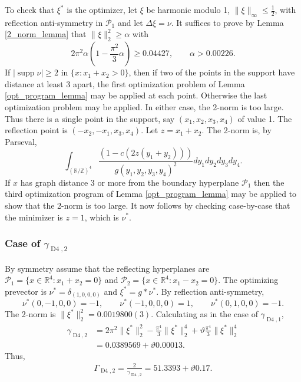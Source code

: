 \documentclass[a4paper, 12pt, notitlepage]{amsart}
\newcommand{\Dfour}{\operatorname{D4}}
\newcommand{\supp}{\operatorname{supp}}
\newcommand{\bR}{\mathbb{R}}
\newcommand{\zed}{\mathbb{Z}}
\newcommand{\sP}{{\mathscr{P}}}
\theoremstyle{remark}
\begin{document}
To check that $\xi^*$ is the optimizer, let $\xi$ be harmonic modulo 1, $\|\xi\|_\infty \leq \frac{1}{2}$, with reflection anti-symmetry in $\sP_1$ and let $\Delta \xi = \nu$.  It suffices to prove by Lemma \ref{2_norm_lemma} that  $\|\xi\|_2^2 \geq \alpha$ with 
\begin{equation}
 2\pi^2 \alpha\left(1 - \frac{\pi^2}{3}\alpha \right) \geq 0.04427, \qquad \alpha >0.00226. 
\end{equation}
If  $|\supp \nu| \geq 2$ in $\{x: x_1 + x_2 > 0\}$, then if two of the points in the support have distance at least 3 apart, the first optimization problem of Lemma \ref{opt_program_lemma} may be applied at each point.  Otherwise the last optimization problem may be applied.  In either case, the 2-norm is too large.  Thus there is a single point in the support, say $(x_1, x_2, x_3, x_4)$ of value 1.  The reflection point is $(-x_2, -x_1, x_3, x_4)$.  Let $z = x_1 + x_2$.  The 2-norm is, by Parseval,
\begin{equation}
 \int_{(\bR/\zed)^4} \frac{(1 - c(2z(y_1+y_2)))}{g(y_1, y_2, y_3, y_4)^2}dy_1dy_2dy_3dy_4.
\end{equation}
If $x$ has graph distance 3 or more from the boundary hyperplane $\sP_1$ then the third optimization program of Lemma \ref{opt_program_lemma} may be applied to show that the 2-norm is too large.  It now follows by checking case-by-case that the minimizer is $z = 1$, which is $\nu^*$.  


\subsubsection*{Case of $\gamma_{\Dfour,2}$}  By symmetry  assume that the reflecting hyperplanes are $\sP_1 = \{x \in \bR^4: x_1 + x_2 = 0\}$ and $\sP_2 = \{x \in \bR^4: x_1 - x_2 = 0\}$. The optimizing prevector is $\nu^* = \delta_{(1,0,0,0)}$ and $\xi^* = g* \nu^*$.  By reflection anti-symmetry, 
\begin{equation}
 \nu^*(0, -1, 0, 0) = -1, \qquad \nu^*(-1, 0, 0, 0) = 1, \qquad \nu^*(0, 1, 0, 0) = -1.
\end{equation}
The 2-norm is $\|\xi^*\|_2^2 = 0.0019800(3).$ Calculating as in the case of $\gamma_{\Dfour, 1}$,
\begin{align*}
\gamma_{\Dfour,2}&= 2\pi^2 \|\xi^*\|_2^2 - \frac{\pi^4}{3}\|\xi^*\|_2^4 + \vartheta \frac{\pi^4}{3}\|\xi^*\|_2^4\\
 &=0.0389569 +\vartheta 0.00013.
\end{align*}
Thus,
\begin{align*}
 \Gamma_{\Dfour,2} =\frac{2}{\gamma_{\Dfour, 2}} =  51.3393 + \vartheta 0.17.
\end{align*}
\end{document}
